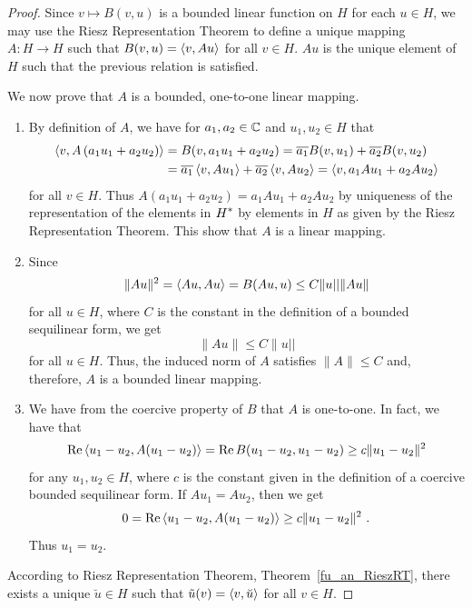\begin{proof}
 Since $v \mapsto B(v,u)$ is a bounded linear function on
$H$ for each $u\in H$, we may use the Riesz Representation Theorem
to define a unique mapping $A:H \rightarrow H$ such that
$\displaystyle B(v,u) = \left\langle{v} , {Au}\right\rangle$ for all $v \in H$.
$Au$ is the unique element of $H$ such that the previous relation is
satisfied.

We now prove that $A$ is a bounded, one-to-one linear mapping.
\begin{enumerate}
\item By definition of $A$, we have for $a_1, a_2 \in \mathbb{C}$ and
$u_1, u_2 \in H$ that
\begin{align*}
\left\langle{v} , {A\left( a_1 u_1 + a_2 u_2 \right)}\right\rangle
&= B(v,a_1 u_1 + a_2 u_2) = \overline{a_1} B(v,u_1) + \overline{a_2} B(v,u_2) \\
&= \overline{a_1} \left\langle{v} , {A u_1}\right\rangle + \overline{a_2} \left\langle{v} , {A u_2}\right\rangle
= \left\langle{v} , {a_1 A u_1 + a_2 A u_2}\right\rangle
\end{align*}
for all $v \in H$.  Thus
$A\left( a_1 u_1 + a_2 u_2 \right) = a_1 A u_1 + a_2 A u_2$ by
uniqueness of the representation of the elements in $\displaystyle H^\ast$ by
elements in $H$ as given by the Riesz Representation Theorem.  This
show that $A$ is a linear mapping.
\item Since
\[
\|Au\|^2 = \left\langle{Au} , {Au}\right\rangle = B(Au,u) \leq C \|u||\|Au\|
\]
for all $u \in H$, where $C$ is the constant in the definition of a
bounded sequilinear form, we get
\begin{equation} \label{fu_an_lax6}
\|Au\| \leq C \|u||
\end{equation}
for all $u \in H$.  Thus, the induced norm of $A$ satisfies
$\|A\| \leq C$ and, therefore, $A$ is a bounded linear mapping.
\item We have from the coercive property of $B$ that $A$ is
one-to-one.  In fact, we have that
\begin{equation} \label{fu_an_lax7}
\operatorname{Re} \left\langle{u_1-u_2} , {A(u_1-u_2)}\right\rangle
= \operatorname{Re} B(u_1-u_2,u_1-u_2) \geq c \|u_1-u_2\|^2
\end{equation}
for any $u_1, u_2 \in H$, where $c$ is the constant given in the
definition of a coercive bounded sequilinear form.
If $A u_1 = A u_2$, then we get
\[
0 = \operatorname{Re} \left\langle{u_1-u_2} , {A(u_1-u_2)}\right\rangle \geq c \|u_1-u_2\|^2 \ .
\]
Thus $u_1=u_2$.
\end{enumerate}

 According to Riesz Representation Theorem,
Theorem~\ref{fu_an_RieszRT}, there exists a unique $\breve{u} \in H$ such that 
$\displaystyle \tilde{u}(v) = \left\langle{v} , {\breve{u}}\right\rangle$ for all $v \in H$.


\end{proof}
